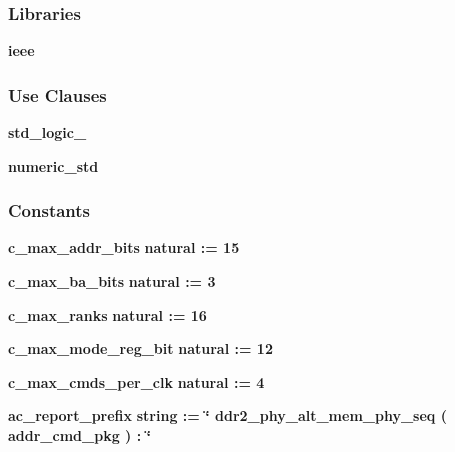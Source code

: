 \subsubsection*{Libraries}
 \begin{DoxyCompactItemize}
\item 
{\bf ieee} 
\end{DoxyCompactItemize}
\subsubsection*{Use Clauses}
 \begin{DoxyCompactItemize}
\item 
{\bf std\+\_\+logic\+\_}   
\item 
{\bf numeric\+\_\+std}   
\end{DoxyCompactItemize}
\subsubsection*{Constants}
 \begin{DoxyCompactItemize}
\item 
{\bf c\+\_\+max\+\_\+addr\+\_\+bits} {\bfseries \textcolor{comment}{natural}\textcolor{vhdlchar}{ }\textcolor{vhdlchar}{ }\textcolor{vhdlchar}{\+:}\textcolor{vhdlchar}{=}\textcolor{vhdlchar}{ }\textcolor{vhdlchar}{ } \textcolor{vhdldigit}{15} \textcolor{vhdlchar}{ }} 
\item 
{\bf c\+\_\+max\+\_\+ba\+\_\+bits} {\bfseries \textcolor{comment}{natural}\textcolor{vhdlchar}{ }\textcolor{vhdlchar}{ }\textcolor{vhdlchar}{\+:}\textcolor{vhdlchar}{=}\textcolor{vhdlchar}{ }\textcolor{vhdlchar}{ } \textcolor{vhdldigit}{3} \textcolor{vhdlchar}{ }} 
\item 
{\bf c\+\_\+max\+\_\+ranks} {\bfseries \textcolor{comment}{natural}\textcolor{vhdlchar}{ }\textcolor{vhdlchar}{ }\textcolor{vhdlchar}{\+:}\textcolor{vhdlchar}{=}\textcolor{vhdlchar}{ }\textcolor{vhdlchar}{ } \textcolor{vhdldigit}{16} \textcolor{vhdlchar}{ }} 
\item 
{\bf c\+\_\+max\+\_\+mode\+\_\+reg\+\_\+bit} {\bfseries \textcolor{comment}{natural}\textcolor{vhdlchar}{ }\textcolor{vhdlchar}{ }\textcolor{vhdlchar}{\+:}\textcolor{vhdlchar}{=}\textcolor{vhdlchar}{ }\textcolor{vhdlchar}{ } \textcolor{vhdldigit}{12} \textcolor{vhdlchar}{ }} 
\item 
{\bf c\+\_\+max\+\_\+cmds\+\_\+per\+\_\+clk} {\bfseries \textcolor{comment}{natural}\textcolor{vhdlchar}{ }\textcolor{vhdlchar}{ }\textcolor{vhdlchar}{\+:}\textcolor{vhdlchar}{=}\textcolor{vhdlchar}{ }\textcolor{vhdlchar}{ } \textcolor{vhdldigit}{4} \textcolor{vhdlchar}{ }} 
\item 
{\bf ac\+\_\+report\+\_\+prefix} {\bfseries \textcolor{comment}{string}\textcolor{vhdlchar}{ }\textcolor{vhdlchar}{ }\textcolor{vhdlchar}{\+:}\textcolor{vhdlchar}{=}\textcolor{vhdlchar}{ }\textcolor{vhdlchar}{ }\textcolor{vhdlchar}{ }\textcolor{vhdlchar}{ }\textcolor{keyword}{\char`\"{} ddr2\+\_\+phy\+\_\+alt\+\_\+mem\+\_\+phy\+\_\+seq ( addr\+\_\+cmd\+\_\+pkg )  \+:  \char`\"{}}\textcolor{vhdlchar}{ }} 
\end{DoxyCompactItemize}
